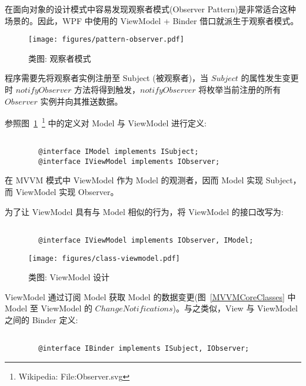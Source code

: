 在面向对象的设计模式中容易发现观察者模式(Observer Pattern)是非常适合这种场景的。因此，WPF 中使用的 ViewModel + Binder 借口就派生于观察者模式。

\begin{figure}[!h]
  \begin{center}
    \texttt{[image: figures/pattern-observer.pdf]}
    \caption{类图: 观察者模式\label{PatternObserver}}
  \end{center}
\end{figure}

程序需要先将观察者实例注册至 Subject (被观察者)，当 $Subject$ 的属性发生变更时 $notifyObserver$ 方法将得到触发，$notifyObserver$ 将枚举当前注册的所有 $Observer$ 实例并向其推送数据。

参照图~\ref{PatternObserver}~\footnote{Wikipedia: File:Observer.svg} 中的定义对 Model 与 ViewModel 进行定义:

\begin{verbatim}

        @interface IModel implements ISubject;
        @interface IViewModel implements IObserver;

\end{verbatim}

在 MVVM 模式中 ViewModel 作为 Model 的观测者，因而 Model 实现 Subject，而 ViewModel 实现 Observer。

为了让 ViewModel 具有与 Model 相似的行为，将 ViewModel 的接口改写为:

\begin{verbatim}

        @interface IViewModel implements IObserver, IModel;

\end{verbatim}

\begin{figure}[!h]
  \begin{center}
    \texttt{[image: figures/class-viewmodel.pdf]}
    \caption{类图: ViewModel 设计\label{ViewModelClass}}
  \end{center}
\end{figure}

ViewModel 通过订阅 Model 获取 Model 的数据变更(图~\ref{MVVMCoreClasses} 中 Model 至 ViewModel 的 $Change Notifications$)。与之类似，View 与 ViewModel 之间的 Binder 定义:

\begin{verbatim}

        @interface IBinder implements ISubject, IObserver;

\end{verbatim}

